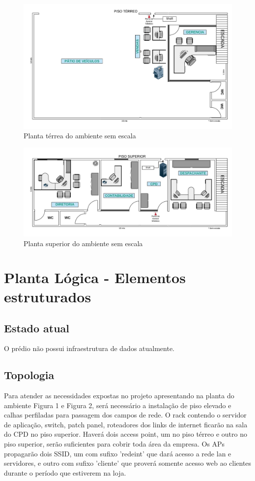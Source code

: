 \documentclass[	DIV=calc,%
							paper=a4,%
							fontsize=12pt,%
							onecolumn]{scrartcl}	 					%
\begin{document}
\begin{figure}[H]
	\centering
	\includegraphics[width=\textwidth]{PlantadoAmbienteTerreo}
	\caption{Planta térrea do ambiente sem escala}
	\label{fig1}
\end{figure}

\begin{figure}[H]
	\centering
	\includegraphics[width=\textwidth]{PlantadoAmbienteSuperior}
	\caption{Planta superior do ambiente sem escala}
	\label{fig2}
\end{figure}

\section{Planta Lógica - Elementos estruturados}

\subsection{Estado atual}
O prédio não possui infraestrutura de dados atualmente.

\subsection{Topologia}
Para atender as necessidades expostas no projeto apresentando na planta do ambiente Figura 1 e Figura 2, será necessário a instalação de piso elevado e calhas perfiladas para passagem dos campos de rede. 
O rack contendo o servidor de aplicação, switch, patch panel, roteadores dos links de internet ficarão na sala do CPD no piso superior.
Haverá dois access point, um no piso térreo e outro no piso superior, serão suficientes para cobrir toda área da empresa. Os APs propagarão dois SSID, um
com sufixo 'redeint' que dará acesso a rede lan e servidores, e outro com sufixo 'cliente' que proverá somente acesso web ao clientes durante o período que estiverem na loja.
\end{document}
